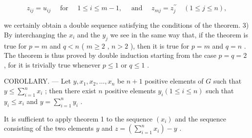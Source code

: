 \[
z _ {i j} = u _ {i j} \quad \text { for } \quad 1 \leqslant i \leqslant m - 1, \quad \text { and } \quad z _ {m j} = z _ {j} ^ {\prime \prime} \quad (1 \leqslant j \leqslant n),
\]

we certainly obtain a double sequence satisfying the conditions of the theorem. 3) By interchanging the \(x_{i}\) and the \(y_{j}\) we see in the same way that, if the theorem is true for \(p = m\) and \(q < n\) ( \(m \geqslant 2\) , \(n > 2\) ), then it is true for \(p = m\) and \(q = n\) . The theorem is thus proved by double induction starting from the case \(p = q = 2\) , for it is trivially true whenever \(p \leqslant 1\) or \(q \leqslant 1\) .

COROLLARY. --- Let \(y, x_1, x_2, \ldots, x_n\) be \(n + 1\) positive elements of \(G\) such that \(y \leqslant \sum_{i=1}^{n} x_i\) ; then there exist \(n\) positive elements \(y_i (1 \leqslant i \leqslant n)\) such that \(y_i \leqslant x_i\) and \(y = \sum_{i=1}^{n} y_i\) .

It is sufficient to apply theorem 1 to the sequence \((x_{i})\) and the sequence consisting of the two elements \(y\) and \(z = \left(\sum_{i=1}^{n} x_{i}\right) - y\) .

